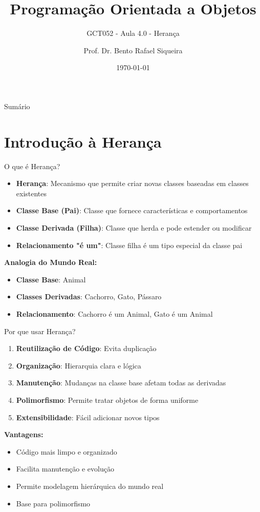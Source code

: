 \documentclass[aspectratio=169]{beamer}
\title{Programação Orientada a Objetos}
\subtitle{GCT052 - Aula 4.0 - Herança}
\author{Prof. Dr. Bento Rafael Siqueira}
\institute{Universidade Federal de Lavras\\Departamento de Ciência da Computação}
\date{\today}
\begin{document}
\begin{frame}
\titlepage
\end{frame}

\begin{frame}{Sumário}
\tableofcontents
\end{frame}

\section{Introdução à Herança}

\begin{frame}{O que é Herança?}
\begin{itemize}
\item \textbf{Herança}: Mecanismo que permite criar novas classes baseadas em classes existentes
\item \textbf{Classe Base (Pai)}: Classe que fornece características e comportamentos
\item \textbf{Classe Derivada (Filha)}: Classe que herda e pode estender ou modificar
\item \textbf{Relacionamento "é um"}: Classe filha é um tipo especial da classe pai
\end{itemize}

\vspace{0.5cm}
\textbf{Analogia do Mundo Real:}
\begin{itemize}
\item \textbf{Classe Base}: Animal
\item \textbf{Classes Derivadas}: Cachorro, Gato, Pássaro
\item \textbf{Relacionamento}: Cachorro é um Animal, Gato é um Animal
\end{itemize}
\end{frame}

\begin{frame}{Por que usar Herança?}
\begin{enumerate}
\item \textbf{Reutilização de Código}: Evita duplicação
\item \textbf{Organização}: Hierarquia clara e lógica
\item \textbf{Manutenção}: Mudanças na classe base afetam todas as derivadas
\item \textbf{Polimorfismo}: Permite tratar objetos de forma uniforme
\item \textbf{Extensibilidade}: Fácil adicionar novos tipos
\end{enumerate}

\vspace{0.5cm}
\textbf{Vantagens:}
\begin{itemize}
\item Código mais limpo e organizado
\item Facilita manutenção e evolução
\item Permite modelagem hierárquica do mundo real
\item Base para polimorfismo
\end{itemize}
\end{frame}
\end{document}
